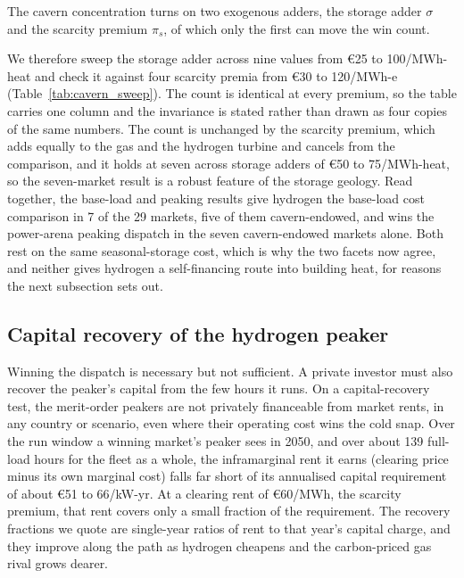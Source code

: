  The cavern concentration turns on two exogenous adders, the storage adder
$\sigma$ and the scarcity premium $\pi_s$, of which only the first can move the win
count.

We therefore sweep the storage adder across nine values from \euro{}25 to 100/MWh-heat
and check it against four scarcity premia from \euro{}30 to 120/MWh-e
(Table~\ref{tab:cavern_sweep}). The count is identical at every premium, so the table
carries one column and the invariance is stated rather than drawn as four copies of the
same numbers. The count is unchanged by the scarcity premium, which adds equally to the gas
and the hydrogen turbine and cancels from the comparison, and it holds at seven across
storage adders of \euro{}50 to 75/MWh-heat, so the seven-market result is a robust
feature of the storage geology. Read together, the base-load and peaking results give hydrogen
the base-load cost comparison in 7 of the 29 markets, five of them
cavern-endowed, and wins the power-arena peaking dispatch in the seven cavern-endowed
markets alone. Both rest on the same seasonal-storage cost, which is why the two facets
now agree, and neither gives hydrogen a self-financing route into building heat, for
reasons the next subsection sets out.

\subsection{Capital recovery of the hydrogen peaker}
\label{sec:results:missing}

Winning the dispatch is necessary but not sufficient. A private investor must also
recover the peaker's capital from the few hours it runs. On a capital-recovery test, the merit-order peakers are not privately financeable from market rents, in any country or scenario, even where their operating cost wins the cold snap. Over the run window a winning market's peaker sees in 2050, and over about
139 full-load hours for the fleet as a whole, the inframarginal rent it earns (clearing
price minus its own marginal cost) falls far short of its annualised capital requirement
of about \euro{}51 to 66/kW-yr. At a clearing rent of \euro{}60/MWh, the scarcity
premium, that rent covers only a small fraction of the requirement. The recovery
fractions we quote are single-year ratios of rent to that year's capital charge, and
they improve along the path as hydrogen cheapens and the carbon-priced gas rival grows
dearer.

